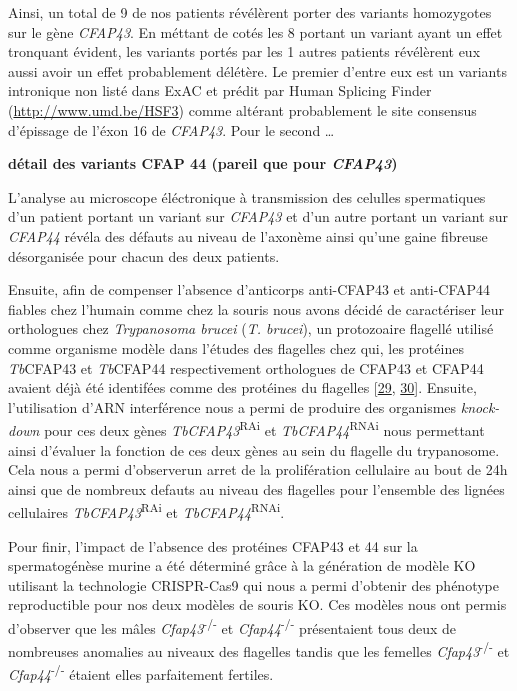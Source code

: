 \documentclass[12pt,twoside]{reedthesis}
\theoremstyle{definition}
\theoremstyle{definition}
\theoremstyle{remark}
\begin{document}
  Ainsi, un total de 9 de nos patients révélèrent porter des variants
  homozygotes sur le gène \emph{CFAP43}. En méttant de cotés les 8 portant
  un variant ayant un effet tronquant évident, les variants portés par les
  1 autres patients révélèrent eux aussi avoir un effet probablement
  délétère. Le premier d'entre eux est un variants intronique non listé
  dans ExAC et prédit par Human Splicing Finder
  (\url{http://www.umd.be/HSF3}) comme altérant probablement le site
  consensus d'épissage de l'éxon 16 de \emph{CFAP43}. Pour le second
  \ldots{}
  
  \textbf{détail des variants CFAP 44 (pareil que pour \emph{CFAP43})}
  
  L'analyse au microscope éléctronique à transmission des celulles
  spermatiques d'un patient portant un variant sur \emph{CFAP43} et d'un
  autre portant un variant sur \emph{CFAP44} révéla des défauts au niveau
  de l'axonème ainsi qu'une gaine fibreuse désorganisée pour chacun des
  deux patients.
  
  Ensuite, afin de compenser l'absence d'anticorps anti-CFAP43 et
  anti-CFAP44 fiables chez l'humain comme chez la souris nous avons décidé
  de caractériser leur orthologues chez \emph{Trypanosoma brucei}
  (\emph{T. brucei}), un protozoaire flagellé utilisé comme organisme
  modèle dans l'études des flagelles chez qui, les protéines
  \emph{Tb}CFAP43 et \emph{Tb}CFAP44 respectivement orthologues de CFAP43
  et CFAP44 avaient déjà été identifées comme des protéines du flagelles
  {[}\protect\hyperlink{ref-Broadhead2006}{29},
  \protect\hyperlink{ref-Subota2014}{30}{]}. Ensuite, l'utilisation d'ARN
  interférence nous a permi de produire des organismes \emph{knock-down}
  pour ces deux gènes \emph{TbCFAP43}\textsuperscript{RAi} et
  \emph{TbCFAP44}\textsuperscript{RNAi} nous permettant ainsi d'évaluer la
  fonction de ces deux gènes au sein du flagelle du trypanosome. Cela nous
  a permi d'observerun arret de la prolifération cellulaire au bout de 24h
  ainsi que de nombreux defauts au niveau des flagelles pour l'ensemble
  des lignées cellulaires \emph{TbCFAP43}\textsuperscript{RAi} et
  \emph{TbCFAP44}\textsuperscript{RNAi}.
  
  Pour finir, l'impact de l'absence des protéines CFAP43 et 44 sur la
  spermatogénèse murine a été déterminé grâce à la génération de modèle KO
  utilisant la technologie CRISPR-Cas9 qui nous a permi d'obtenir des
  phénotype reproductible pour nos deux modèles de souris KO. Ces modèles
  nous ont permis d'observer que les mâles
  \emph{Cfap43}\textsuperscript{-/-} et \emph{Cfap44}\textsuperscript{-/-}
  présentaient tous deux de nombreuses anomalies au niveaux des flagelles
  tandis que les femelles \emph{Cfap43}\textsuperscript{-/-} et
  \emph{Cfap44}\textsuperscript{-/-} étaient elles parfaitement fertiles.
  
\end{document}
